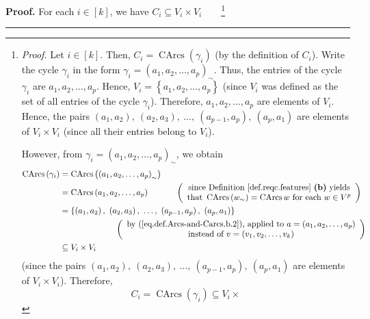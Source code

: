 \documentclass[numbers=enddot,12pt,final,onecolumn,notitlepage]{scrartcl}%
\numberwithin{exer}{section}
\theoremstyle{definition}
\newenvironment{proof}[1][Proof]{\noindent\textbf{#1.} }{\ \rule{0.5em}{0.5em}}
\newenvironment{verlong}{}{}
\begin{document}
\begin{verlong}
\begin{proof}
For each $i\in\left[  k\right]  $, we have $C_{i}\subseteq V_{i}\times V_{i}%
$\ \ \ \ \footnote{\textit{Proof.} Let $i\in\left[  k\right]  $. Then,
$C_{i}=\operatorname*{CArcs}\left(  \gamma_{i}\right)  $ (by the definition of
$C_{i}$). Write the cycle $\gamma_{i}$ in the form $\gamma_{i}=\left(
a_{1},a_{2},\ldots,a_{p}\right)  _{\sim}$. Thus, the entries of the cycle
$\gamma_{i}$ are $a_{1},a_{2},\ldots,a_{p}$. Hence, $V_{i}=\left\{
a_{1},a_{2},\ldots,a_{p}\right\}  $ (since $V_{i}$ was defined as the set of
all entries of the cycle $\gamma_{i}$). Therefore, $a_{1},a_{2},\ldots,a_{p}$
are elements of $V_{i}$. Hence, the pairs $\left(  a_{1},a_{2}\right)
,\ \left(  a_{2},a_{3}\right)  ,\ \ldots,\ \left(  a_{p-1},a_{p}\right)
,\ \left(  a_{p},a_{1}\right)  $ are elements of $V_{i}\times V_{i}$ (since
all their entries belong to $V_{i}$).
\par
However, from $\gamma_{i}=\left(  a_{1},a_{2},\ldots,a_{p}\right)  _{\sim}$,
we obtain%
\begin{align*}
\operatorname*{CArcs}\left(  \gamma_{i}\right)   &  =\operatorname*{CArcs}%
\left(  \left(  a_{1},a_{2},\ldots,a_{p}\right)  _{\sim}\right) \\
&  =\operatorname*{CArcs}\left(  a_{1},a_{2},\ldots,a_{p}\right)
\ \ \ \ \ \ \ \ \ \ \left(
\begin{array}
[c]{c}%
\text{since Definition \ref{def.reqc.features} \textbf{(b)} yields}\\
\text{that }\operatorname*{CArcs}\left(  w_{\sim}\right)
=\operatorname*{CArcs}w\text{ for each }w\in V^{p}%
\end{array}
\right) \\
&  =\left\{  \left(  a_{1},a_{2}\right)  ,\ \left(  a_{2},a_{3}\right)
,\ \ldots,\ \left(  a_{p-1},a_{p}\right)  ,\ \left(  a_{p},a_{1}\right)
\right\} \\
&  \ \ \ \ \ \ \ \ \ \ \ \ \ \ \ \ \ \ \ \ \left(
\begin{array}
[c]{c}%
\text{by (\ref{eq.def.Arcs-and-Carcs.b.2}), applied to }a=\left(  a_{1}%
,a_{2},\ldots,a_{p}\right) \\
\text{instead of }v=\left(  v_{1},v_{2},\ldots,v_{k}\right)
\end{array}
\right) \\
&  \subseteq V_{i}\times V_{i}%
\end{align*}
(since the pairs $\left(  a_{1},a_{2}\right)  ,\ \left(  a_{2},a_{3}\right)
,\ \ldots,\ \left(  a_{p-1},a_{p}\right)  ,\ \left(  a_{p},a_{1}\right)  $ are
elements of $V_{i}\times V_{i}$). Therefore,%
\[
C_{i}=\operatorname*{CArcs}\left(  \gamma_{i}\right)  \subseteq V_{i}\times
\]}
\end{proof}
\end{verlong}
\end{document}
